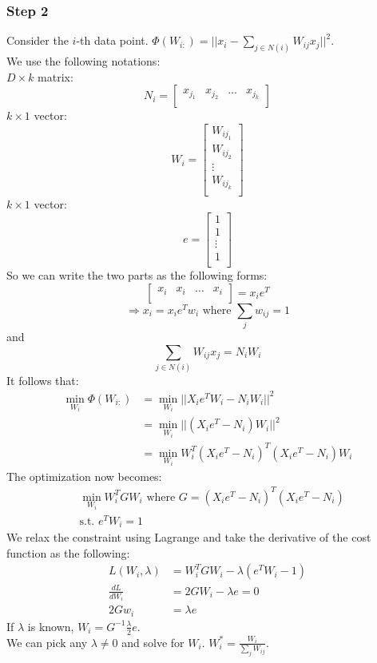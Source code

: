 \subsubsection*{Step 2}
Consider the $i$-th data point. $\Phi (W_{i:})=||x_i-\sum_{j\in N(i)}
W_{ij} x_j||^2$.\\ 
We use the following notations:\\
$D\times k$ matrix:
\[N_i=
\begin{bmatrix}
    x_{j_1} & x_{j_2} & \dots & x_{j_k} \\
\end{bmatrix}
\]
$k\times 1$ vector:
\[W_i=
\begin{bmatrix}
    W_{ij_1} \\
    W_{ij_2} \\
    \vdots \\
    W_{ij_k} \\
\end{bmatrix}
\]
$k\times 1$ vector:
\[e=
\begin{bmatrix}
    1 \\
    1 \\
    \vdots \\
    1 \\
\end{bmatrix}
\]
So we can write the two parts as the following forms:
\[
\begin{bmatrix}
    x_i & x_i & \dots & x_i \\
\end{bmatrix} = x_i e^T
\]
\[
\Rightarrow x_i = x_i e^T w_i \text{ where } \sum_j w_{ij} = 1
\]
and
\[
\sum_{j\in N(i)} W_{ij} x_j=N_i W_i
\]
It follows that:
\begin{align*}
\min_{W_i} \Phi (W_{i:})
&= \min_{W_i} ||X_i e^T W_i - N_i W_i||^2\\
&= \min_{W_i} ||(X_i e^T-N_i)W_i||^2\\
&= \min_{W_i} W_i^T (X_i e^T-N_i)^T (X_i e^T - N_i)W_i
\end{align*}
The optimization now becomes:
\begin{align*}
&\min_{W_i} W_i^T G W_i \text{ where }G = (X_i e^T-N_i)^T (X_i e^T - N_i)\\
&\text{s.t. } e^T W_i = 1
\end{align*}
We relax the constraint using Lagrange and take the derivative of the
cost function as the following: 
\begin{align*}
L(W_i,\lambda) &= W_i^T G W_i - \lambda (e^T W_i - 1)\\
\frac{dL}{dW_i} &= 2GW_i - \lambda e = 0\\
2Gw_i &= \lambda e
\end{align*}
If $\lambda$ is known, $W_i=G^{-1} \frac{\lambda}{2} e$.\\
We can pick any $\lambda \neq 0$ and solve for $W_i$. $W_i^* =
\frac{W_i}{\sum_j W_{ij}}$. 

